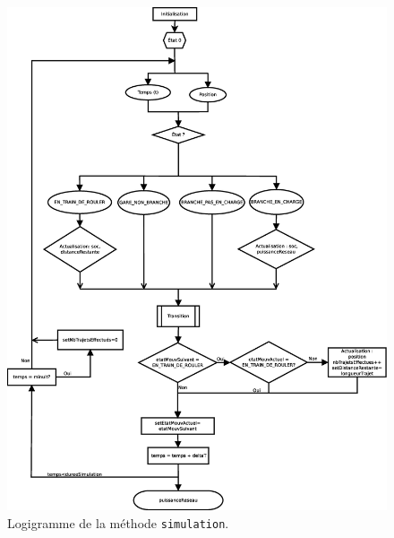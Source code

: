 			\begin{figure}
				\centering
				\includegraphics[height=0.9\textheight]{fig/flowPrincipal.eps}
				\caption{Logigramme de la méthode \lstinline{simulation}.\label{fig.flowPrincipal}}
			\end{figure}
